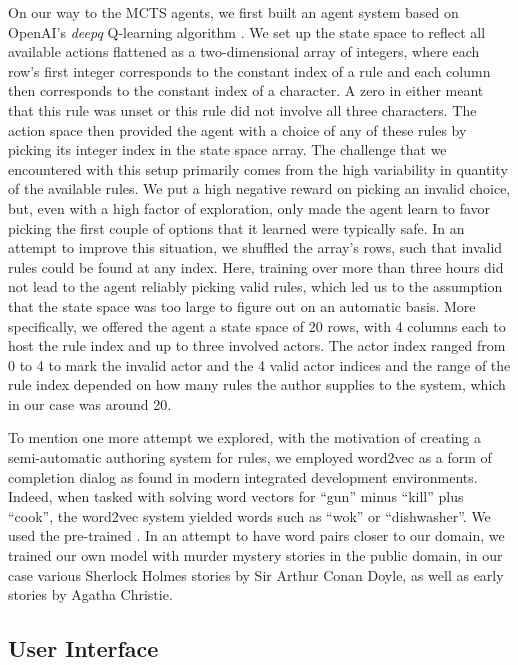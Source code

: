 On our way to the MCTS agents, we first built an agent system based on OpenAI's \emph{deepq} Q-learning algorithm . We set up the state space to reflect all available actions flattened as a two-dimensional array of integers, where each row's first integer corresponds to the constant index of a rule and each column then corresponds to the constant index of a character. A zero in either meant that this rule was unset or this rule did not involve all three characters. The action space then provided the agent with a choice of any of these rules by picking its integer index in the state space array. The challenge that we encountered with this setup primarily comes from the high variability in quantity of the available rules. We put a high negative reward on picking an invalid choice, but, even with a high factor of exploration, only made the agent learn to favor picking the first couple of options that it learned were typically safe. In an attempt to improve this situation, we shuffled the array's rows, such that invalid rules could be found at any index. Here, training over more than three hours did not lead to the agent reliably picking valid rules, which led us to the assumption that the state space was too large to figure out on an automatic basis. More specifically, we offered the agent a state space of 20 rows, with 4 columns each to host the rule index and up to three involved actors. The actor index ranged from 0 to 4 to mark the invalid actor and the 4 valid actor indices and the range of the rule index depended on how many rules the author supplies to the system, which in our case was around 20.

To mention one more attempt we explored, with the motivation of creating a semi-automatic authoring system for rules, we employed word2vec  as a form of completion dialog as found in modern integrated development environments.
Indeed, when tasked with solving word vectors for \enquote{gun} minus \enquote{kill} plus \enquote{cook}, the word2vec system yielded words such as \enquote{wok} or \enquote{dishwasher}.
We used the pre-trained .
In an attempt to have word pairs closer to our domain, we trained our own model with murder mystery stories in the public domain, in our case various Sherlock Holmes stories by Sir Arthur Conan Doyle, as well as early stories by Agatha Christie.

\subsection{User Interface} \label{user_interface}


